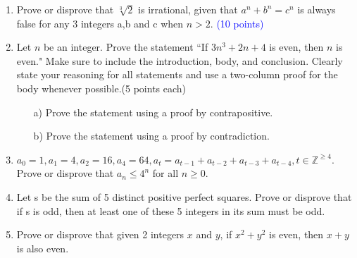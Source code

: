 \documentclass{article}
\newcommand{\pt}[1]{\textcolor{blue}{(#1 points)}}
\begin{document}
\begin{enumerate}
    \item Prove or disprove that $\sqrt[3]{2}$ is irrational, given that $a^n + b^n = c^n$ is always false for any 3 integers a,b and c when $n > 2$. \pt{10}
    
    \item{Let $n$ be an integer. Prove the statement ``If $3n^3 + 2n + 4$ is even, then $n$ is even." Make sure to include the introduction, body, and conclusion. Clearly state your reasoning for all statements and use a two-column proof for the body whenever possible.\hfill\hfill \color{blue}(5 points each)}
    \begin{enumerate}
        \item[a)] Prove the statement using a proof by contrapositive.
        \item[b)] Prove the statement using a proof by contradiction.
    \end{enumerate}

    \item{$a_0 = 1, a_1 = 4, a_2 = 16, a_4 = 64, a_{t} = a_{t-1} + a_{t-2} + a_{t-3} + a_{t-4}, t \in \mathbb{Z}^{\geq 4}$. Prove or disprove that $a_n \leq 4^n$ for all $n \geq 0$.}
    
    \item Let s be the sum of 5 distinct positive perfect squares. Prove or disprove that if s is odd, then at least one of these 5 integers in its sum must be odd.
    
    \item Prove or disprove that given 2 integers $x$ and $y$, if $x^2 + y^2$ is even, then $x + y$ is also even.
    
    
    
\end{enumerate}
\end{document}
